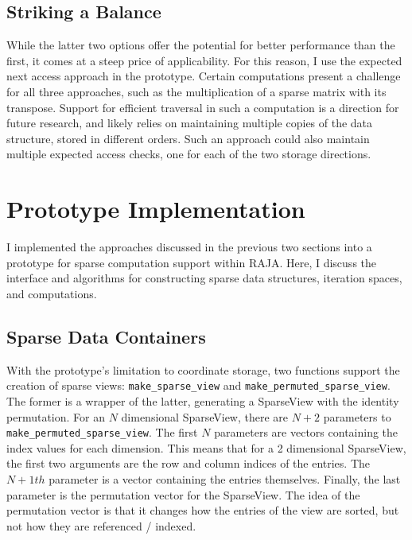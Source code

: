 \subsection{Striking a Balance}
While the latter two options offer the potential for better performance than the first, it comes at a steep price of applicability.
For this reason, I use the expected next access approach in the prototype.
Certain computations present a challenge for all three approaches, such as the multiplication of a sparse matrix with its transpose.
Support for efficient traversal in such a computation is a direction for future research, and likely relies on maintaining multiple copies of the data structure, stored in different orders.
Such an approach could also maintain multiple expected access checks, one for each of the two storage directions.

\section{Prototype Implementation}
I implemented the approaches discussed in the previous two sections into a prototype for sparse computation support within RAJA\@.
Here, I discuss the interface and algorithms for constructing sparse data structures, iteration spaces, and computations.

\subsection{Sparse Data Containers}

With the prototype's limitation to coordinate storage, two functions support the creation of sparse views: \verb.make_sparse_view. and \verb.make_permuted_sparse_view..
The former is a wrapper of the latter, generating a SparseView with the identity permutation.
For an $N$ dimensional SparseView, there are $N+2$ parameters to \verb.make_permuted_sparse_view..
The first $N$ parameters are vectors containing the index values for each dimension. 
This means that for a 2 dimensional SparseView, the first two arguments are the row and column indices of the entries.
The $N+1th$ parameter is a vector containing the entries themselves. 
Finally, the last parameter is the permutation vector for the SparseView. 
The idea of the permutation vector is that it changes how the entries of the view are sorted, but not how they are referenced / indexed.

